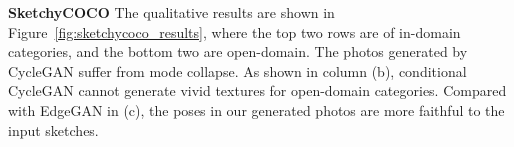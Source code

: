 \documentclass[10pt,twocolumn,letterpaper]{article}
\begin{document}
\noindent \textbf{SketchyCOCO} The qualitative results are shown in Figure~\ref{fig:sketchycoco_results}, where the top two rows are of in-domain categories, and the bottom two are open-domain. The photos generated by CycleGAN suffer from mode collapse. As shown in column (b), conditional CycleGAN cannot generate vivid textures for open-domain categories. Compared with EdgeGAN in (c), the poses in our generated photos are more faithful to the input sketches. 



\newcommand{\cocowidth}{0.18} 
\end{document}
